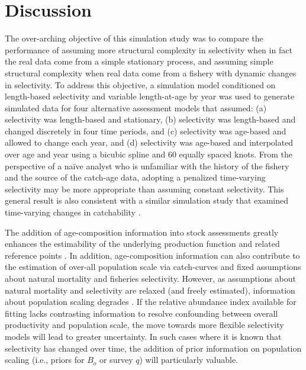 \section*{Discussion} %
\label{sec:discussion}

The over-arching objective of this simulation study was to compare the performance of assuming more structural complexity in selectivity when in fact the real data come from a simple stationary process, and assuming simple structural complexity when real data come from a fishery with dynamic changes in selectivity.  To address this objective, a simulation model conditioned on length-based selectivity and variable length-at-age by year was used to generate simulated data for four alternative assessment models that assumed: (a) selectivity was length-based and stationary, (b) selectivity was length-based and changed discretely in four time periods, and (c) selectivity was age-based and allowed to change each year, and (d) selectivity was age-based and interpolated over age and year using a bicubic spline and 60 equally spaced knots.  From the perspective of a na\"ive analyst who is unfamiliar with the history of the fishery and the source of the catch-age data, adopting a penalized time-varying selectivity may be more appropriate than assuming constant selectivity.  This general result is also consistent with a similar simulation study that examined time-varying changes in catchability \citep{wilberg2006performance}.

The addition of age-composition information into stock assessments greatly enhances the estimability of the underlying production function and related reference points \citep{magnusson2007mfd}.  In addition, age-composition information can also contribute to the estimation of over-all population scale via catch-curves and fixed assumptions about natural mortality and fisheries selectivity.  However, as assumptions about natural mortality and selectivity are relaxed (and freely estimated), information about population scaling degrades \citep{hilborn1992quantitative}. If the relative abundance index available for fitting lacks contrasting information to resolve confounding between overall productivity and population scale, the move towards more flexible selectivity models will lead to greater uncertainty.  In such cases where it is known that selectivity has changed over time, the addition of prior information on population scaling (i.e., priors for $B_o$ or survey $q$) will particularly valuable. 

